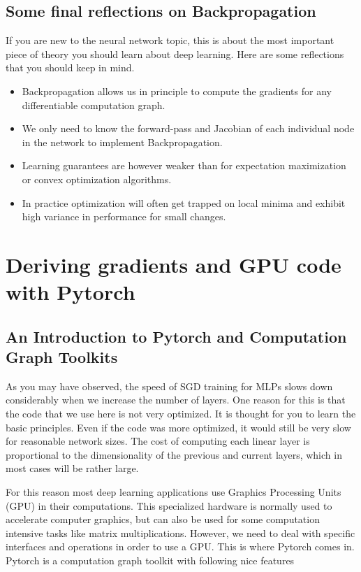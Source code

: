 \subsection{Some final reflections on Backpropagation}

If you are new to the neural network topic, this is about the most important
piece of theory you should learn about deep learning. Here are some reflections
that you should keep in mind.

\begin{itemize}
\item Backpropagation allows us in principle to compute the gradients for any differentiable computation graph.

\item We only need to know the forward-pass and Jacobian of each individual node in the network to implement Backpropagation.

\item Learning guarantees are however weaker than for expectation maximization or convex optimization algorithms.

\item In practice optimization will often get trapped on local minima and exhibit high variance in performance for small changes.
\end{itemize}

\section{Deriving gradients and GPU code with Pytorch}

\subsection{An Introduction to Pytorch and Computation Graph Toolkits}

As you may have observed, the speed of SGD training for MLPs slows down
considerably when we increase the number of layers. One reason for this is that
the code that we use here is not very optimized. It is thought for you to
learn the basic principles. Even if the code was more optimized, it would still be
very slow for reasonable network sizes. The cost of computing each
linear layer is proportional to the dimensionality of the previous and current
layers, which in most cases will be rather large.

For this reason most deep learning applications use Graphics Processing Units
(GPU) in their computations. This specialized hardware is normally used to
accelerate computer graphics, but can also be used for some computation
intensive tasks like matrix multiplications. However, we need to deal with
specific interfaces and operations in order to use a GPU. This is where Pytorch
comes in. Pytorch is a computation graph toolkit with following nice features

